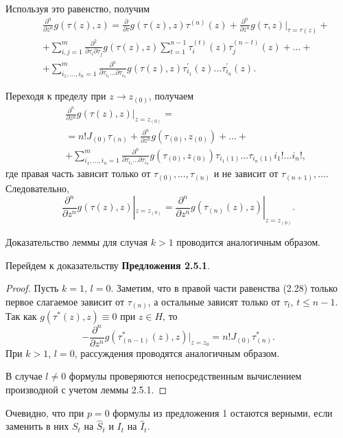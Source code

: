          Используя это равенство, получим \begin{align} &&\frac{\partial^n}{\partial
             z^n} g(\tau(z),z)= \frac{\partial}{\partial \tau}g(\tau(z),z)
    \tau^{(n)}(z) +
    \frac{\partial^n}{\partial z^n} g(\tau,z)|_{\tau=\tau(z)}+\nonumber \\
        &&+\sum^m_{i,j=1}\frac{\partial^2}{\partial\tau_i\partial\tau_j}
        g\left(\tau(z),z\right)\sum^{n-1}_{t=1}\tau^{(t)}_i(z)\tau^{(n-t)}_j(z)
    +\ldots+\nonumber\\
        &&+\sum^m_{i_1,\ldots,i_n=1}
        \frac{\partial^n}{\partial\tau_{i_1}\ldots\partial\tau_{i_n}}
        g\left(\tau(z),z\right) \tau^{'}_{i_1}(z)\ldots
        \tau^{'}_{i_n}(z).\nonumber \end{align}

        Переходя к пределу при $z\to z_{(0)}$, получаем \begin{align}
        &&\frac{\partial^n}{\partial z^n} g(\tau(z),z)|_{z=z_{(0)}}= \nonumber \\
            &&=n! J_{(0)}\tau_{(n)}+\frac{\partial^n}{\partial z^n}
            g(\tau_{(0)},
                    z_{(0)})+\ldots+  \\
                &&+\sum^m_{i_1,\ldots,i_n=1}
                \frac{\partial^n}{\partial\tau_{i_1}\ldots\partial\tau_{i_n}}
                g(\tau_{(0)},z_{(0)})\tau_{i_1(1)}\ldots\tau_{i_n(1)} i_1!\ldots
                i_n!, \nonumber \end{align} где правая часть зависит только от
                $\tau_{(0)},\ldots,\tau_{(n)}$ и не зависит от
                $\tau_{(n+1)},\ldots$. Следовательно,
                $$
                \frac{\partial^n}{\partial z^n} g\left(\tau(z),z\right)|_{z=z_{(0)}}
                = \frac{\partial^n}{\partial z^n}
                g\left(\tau_{(n)}(z),z\right)|_{z=z_{(0)}}.
                $$

                Доказательство леммы для случая $k>1$ проводится аналогичным
                образом.

                Перейдем к доказательству \textbf{ Предложения 2.5.1}.
                \begin{proof} Пусть $k=1$,
                $l=0$. Заметим, что в правой части равенства (2.28) только первое
                слагаемое зависит от $\tau_{(n)}$, а остальные зависят только от
                $\tau_t$, $t\leq n-1$. Так как $g(\tau^*(z),z)\equiv 0$ при $z\in
                H$, то
                $$
                -\frac{\partial^n}{\partial z^n} g\left(\tau^*_{(n-1)}(z),
                        z\right)|_{z=z_0}= n! J_{(0)}\tau^*_{(n)}.
                $$
                При $k>1$, $l=0$, рассуждения проводятся аналогичным образом.

                В случае $l\ne 0$ формулы проверяются непосредственным вычислением
                производной с учетом леммы 2.5.1.
                \end{proof}
                Очевидно, что при $p=0$ формулы из предложения 1 остаются верными,
                если заменить в них $S_t$ на $\hat S_t$ и $I_t$ на $\hat I_t$.

